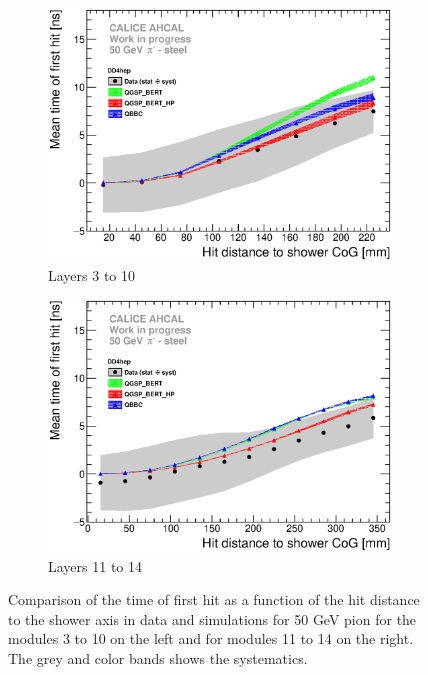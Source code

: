 \documentclass{JINST}
\begin{document}
\begin{figure}[htbp!]
  \begin{subfigure}[t]{0.49\textwidth}
    \centering
    \includegraphics[width=1\textwidth]{fig/Time_Radius_50GeV_SSF_DD4hep.eps}
    \caption{Layers 3 to 10} \label{fig:Radius_SSF_SimData_50GeV}
  \end{subfigure}
  \hfill
  \begin{subfigure}[t]{0.49\textwidth}
    \centering
    \includegraphics[width=1\textwidth]{fig/Time_Radius_50GeV_BL_DD4hep.eps}
    \caption{Layers 11 to 14} \label{fig:Radius_BL_SimData_50GeV}
  \end{subfigure}
  \caption{Comparison of the time of first hit as a function of the hit distance to the shower axis in data and simulations for 50 GeV pion for the modules 3 to 10 on the left and for modules 11 to 14 on the right. The grey and color bands shows the systematics.}
  \label{fig:Radius_SSF_SimData_50GeVComparison}
\end{figure}
\end{document}
